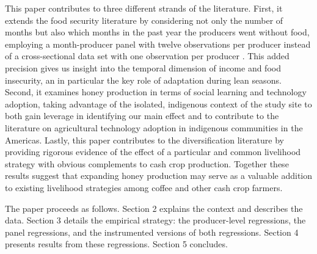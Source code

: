 \documentclass[../main.tex]{subfiles}
\begin{document}
This paper contributes to three different strands of the literature. First, it extends the food security literature by considering not only the number of months but also which months in the past year the producers went without food, employing a month-producer panel with twelve observations per producer instead of a cross-sectional data set with one observation per producer \parencite{barrettMeasuringFoodInsecurity2010}. This added precision gives us insight into the temporal dimension of income and food insecurity, an in particular the key role of adaptation during lean seasons. Second, it examines honey production in terms of social learning and technology adoption, taking advantage of the isolated, indigenous context of the study site to both gain leverage in identifying our main effect and to contribute to the literature on agricultural technology adoption in indigenous communities in the Americas. Lastly, this paper contributes to the diversification literature by providing rigorous evidence of the effect of a particular and common livelihood strategy with obvious complements to cash crop production. Together these results suggest that expanding honey production may serve as a valuable addition to existing livelihood strategies among coffee and other cash crop farmers. 
 
The paper proceeds as follows. Section 2 explains the context and describes the data. Section 3 details the empirical strategy: the producer-level regressions, the panel regressions, and the instrumented versions of both regressions. Section 4 presents results from these regressions.
Section 5 concludes.
\end{document}
